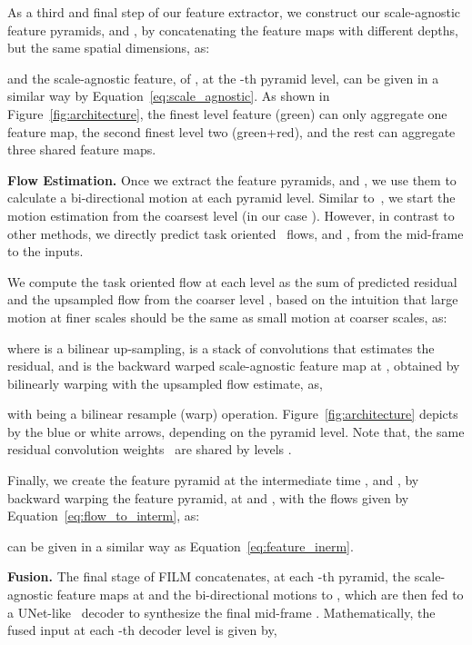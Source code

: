 \documentclass[runningheads]{llncs}
\begin{document}
As a third and final step of our feature extractor, we construct our scale-agnostic feature pyramids,  and , by concatenating the feature maps with different depths, but the same spatial dimensions, as:

and the scale-agnostic feature,  of , at the -th pyramid level, can be given in a similar way by Equation~\ref{eq:scale_agnostic}. As shown in Figure~\ref{fig:architecture}, the finest level feature (green) can only aggregate one feature map, the second finest level two (green+red), and the rest can aggregate three shared feature maps.

\vspace{0.05in}
\noindent\textbf{Flow Estimation.} Once we extract the feature pyramids,  and , we use them to calculate a bi-directional motion at each pyramid level. Similar to~\cite{sun2018pwc}, we start the motion estimation from the coarsest level (in our case ). However, in contrast to other methods, we directly predict task oriented~\cite{vimeo,ucf101} flows,  and , from the mid-frame to the inputs. 


We compute the task oriented flow at each level  as the sum of predicted residual and the upsampled flow from the coarser level , based on the intuition that large motion at finer scales should be the same as small motion at coarser scales, as:

where  is a bilinear up-sampling,  is a stack of convolutions that estimates the residual, and  is the backward warped scale-agnostic feature map at , obtained by bilinearly warping  with the upsampled flow estimate, as,   
 
with  being a bilinear resample (warp) operation. Figure~\ref{fig:architecture} depicts  by the blue or white arrows, depending on the pyramid level. Note that, the same residual convolution weights ~are shared by levels .

Finally, we create the feature pyramid at the intermediate time ,  and , by backward warping the feature pyramid, at  and , with the flows given by Equation~\ref{eq:flow_to_interm}, as:
 
 can be given in a similar way as Equation~\ref{eq:feature_inerm}.

\vspace{0.05in}
\noindent\textbf{Fusion.} The final stage of FILM concatenates, at each -th pyramid, the scale-agnostic feature maps at  and the bi-directional motions to , which are then fed to a UNet-like~\cite{unet} decoder to synthesize the final mid-frame . Mathematically, the fused input at each -th decoder level is given by, 
\end{document}
